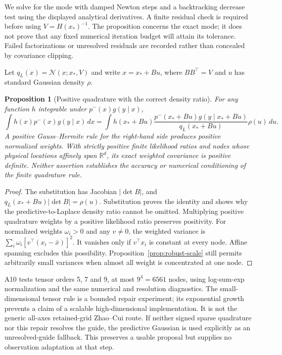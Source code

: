 \documentclass[11pt]{article}
\newtheorem{proposition}{Proposition}
\begin{document}
We solve for the mode with damped Newton steps and a backtracking decrease
test using the displayed analytical derivatives. A finite residual check
is required before using $V=H(x_*)^{-1}$. The proposition concerns the
exact mode; it does not prove that any fixed numerical iteration budget
will attain its tolerance. Failed factorizations or unresolved residuals
are recorded rather than concealed by covariance clipping.

Let $q_L(x)=\mathcal N(x;x_*,V)$ and write $x=x_*+Bu$, where
$BB^\top=V$ and $u$ has standard Gaussian density $\rho$.

\begin{proposition}[Positive quadrature with the correct density ratio]
\label{prop:robust-change-measure}
For any function $h$ integrable under $p^-(x)g(y\mid x)$,
\begin{equation}
 \int h(x)p^-(x)g(y\mid x)\,dx
 =\int h(x_*+Bu)
   \frac{p^-(x_*+Bu)g(y\mid x_*+Bu)}{q_L(x_*+Bu)}\rho(u)\,du .
 \label{eq:robust-change-measure}
\end{equation}
A positive Gauss--Hermite rule for the right-hand side produces positive
normalized weights. With strictly positive finite likelihood ratios and
nodes whose physical locations affinely span $\mathbb R^d$, its exact
weighted covariance is positive definite. Neither assertion establishes
the accuracy or numerical conditioning of the finite quadrature rule.
\end{proposition}
\begin{proof}
The substitution has Jacobian $|\det B|$, and
$q_L(x_*+Bu)|\det B|=\rho(u)$. Substitution proves the identity and
shows why the predictive-to-Laplace density ratio cannot be omitted.
Multiplying positive quadrature weights by a positive likelihood ratio
preserves positivity. For normalized weights $\omega_i>0$ and any
$v\ne0$, the weighted variance is
$\sum_i\omega_i[v^\top(x_i-\bar x)]^2$. It vanishes only if
$v^\top x_i$ is constant at every node. Affine spanning excludes this
possibility. Proposition~\ref{prop:robust-scale} still permits arbitrarily
small variances when almost all weight is concentrated at one node.
\end{proof}

A10 tests tensor orders 5, 7 and 9, at most $9^4=6561$ nodes, using
log-sum-exp normalization and the same numerical and resolution diagnostics.
The small-dimensional tensor rule is a bounded repair experiment; its
exponential growth prevents a claim of a scalable high-dimensional
implementation. It is not the generic all-axes retained-grid Zhao--Cui
route. If neither signed sparse quadrature nor this repair resolves the
guide, the predictive Gaussian is used explicitly as an unresolved-guide
fallback. This preserves a usable proposal but supplies no observation
adaptation at that step.
\end{document}
